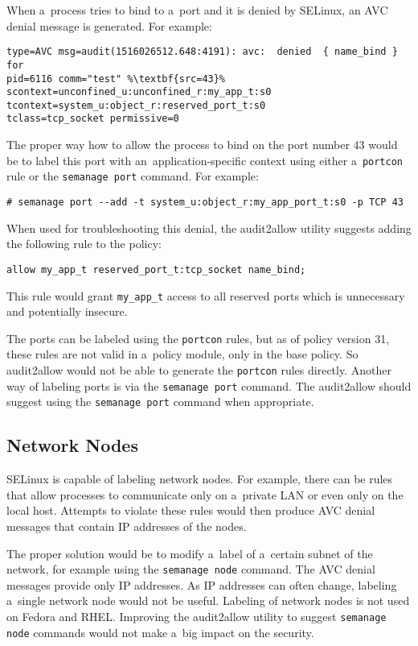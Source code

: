 When a~process tries to bind to a~port and it is denied by SELinux, an AVC
denial message is generated. For example:
\begin{lstlisting}[escapechar=\%]
type=AVC msg=audit(1516026512.648:4191): avc:  denied  { name_bind } for
pid=6116 comm="test" %\textbf{src=43}% scontext=unconfined_u:unconfined_r:my_app_t:s0
tcontext=system_u:object_r:reserved_port_t:s0
tclass=tcp_socket permissive=0
\end{lstlisting}

The proper way how to allow the process to bind on the port number 43 would be
to label this port with an~application-specific context using either
a~\texttt{portcon} rule or the \texttt{semanage port} command. For example:
\begin{lstlisting}
# semanage port --add -t system_u:object_r:my_app_port_t:s0 -p TCP 43
\end{lstlisting}

When used for troubleshooting this denial, the audit2allow utility suggests
adding the following rule to the policy:
\begin{lstlisting}[language=te]
allow my_app_t reserved_port_t:tcp_socket name_bind;
\end{lstlisting}
This rule would grant \texttt{my\_app\_t} access to all reserved ports which is
unnecessary and potentially insecure.

The ports can be labeled using the \texttt{portcon} rules, but as of policy
version 31, these rules are not valid in a~policy module, only in the base
policy. So audit2allow would not be able to generate the \texttt{portcon} rules
directly.  Another way of labeling ports is via the \texttt{semanage port}
command. The audit2allow should suggest using the \texttt{semanage port} command
when appropriate.

\subsection{Network Nodes}
SELinux is capable of labeling network nodes. For example, there can be rules
that allow processes to communicate only on a~private LAN or even only on the
local host. Attempts to violate these rules would then produce AVC denial
messages that contain IP addresses of the nodes.

The proper solution would be to modify a~label of a~certain subnet of the
network, for example using the \texttt{semanage node} command. The AVC denial
messages provide only IP addresses. As IP addresses can often change, labeling
a~single network node would not be useful. Labeling of network nodes is not used
on Fedora and RHEL. Improving the audit2allow utility to suggest
\texttt{semanage node} commands would not make a~big impact on the security.

